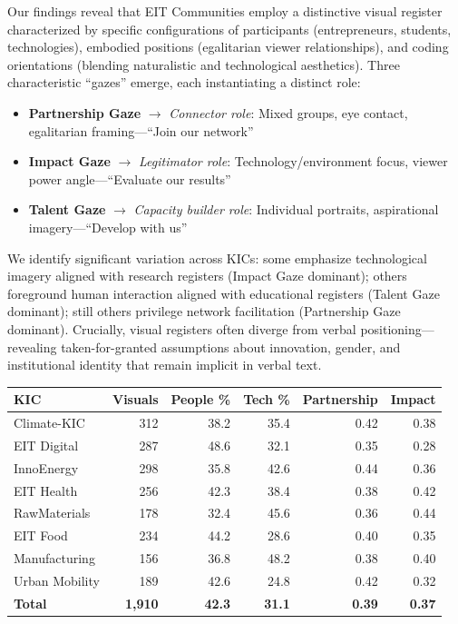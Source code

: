 \documentclass[../main.tex]{subfiles}
\begin{document}
Our findings reveal that EIT Communities employ a distinctive visual register characterized by specific configurations of participants (entrepreneurs, students, technologies), embodied positions (egalitarian viewer relationships), and coding orientations (blending naturalistic and technological aesthetics). Three characteristic ``gazes'' emerge, each instantiating a distinct role:

\begin{itemize}[leftmargin=*, itemsep=0.2em]
    \item \textbf{Partnership Gaze} $\rightarrow$ \textit{Connector role}: Mixed groups, eye contact, egalitarian framing---``Join our network''
    \item \textbf{Impact Gaze} $\rightarrow$ \textit{Legitimator role}: Technology/environment focus, viewer power angle---``Evaluate our results''
    \item \textbf{Talent Gaze} $\rightarrow$ \textit{Capacity builder role}: Individual portraits, aspirational imagery---``Develop with us''
\end{itemize}

\noindent We identify significant variation across KICs: some emphasize technological imagery aligned with research registers (Impact Gaze dominant); others foreground human interaction aligned with educational registers (Talent Gaze dominant); still others privilege network facilitation (Partnership Gaze dominant). Crucially, visual registers often diverge from verbal positioning---revealing taken-for-granted assumptions about innovation, gender, and institutional identity that remain implicit in verbal text.

\begin{center}
\small
\begin{tabular}{lrrrrr}
\toprule
\textbf{KIC} & \textbf{Visuals} & \textbf{People \%} & \textbf{Tech \%} & \textbf{Partnership} & \textbf{Impact} \\
\midrule
Climate-KIC & 312 & 38.2 & 35.4 & 0.42 & 0.38 \\
EIT Digital & 287 & 48.6 & 32.1 & 0.35 & 0.28 \\
InnoEnergy & 298 & 35.8 & 42.6 & 0.44 & 0.36 \\
EIT Health & 256 & 42.3 & 38.4 & 0.38 & 0.42 \\
RawMaterials & 178 & 32.4 & 45.6 & 0.36 & 0.44 \\
EIT Food & 234 & 44.2 & 28.6 & 0.40 & 0.35 \\
Manufacturing & 156 & 36.8 & 48.2 & 0.38 & 0.40 \\
Urban Mobility & 189 & 42.6 & 24.8 & 0.42 & 0.32 \\
\midrule
\textbf{Total} & \textbf{1,910} & \textbf{42.3} & \textbf{31.1} & \textbf{0.39} & \textbf{0.37} \\
\bottomrule
\end{tabular}
\end{center}
\end{document}
